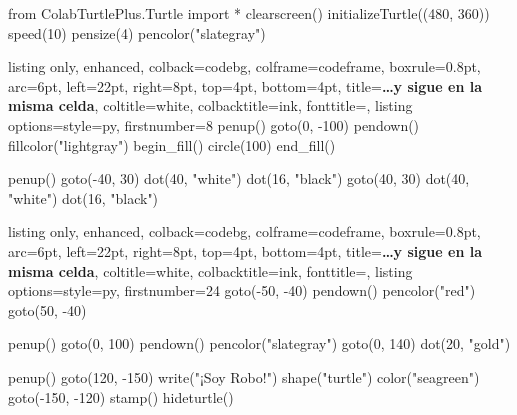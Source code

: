 \begin{typethis}
from ColabTurtlePlus.Turtle import *
clearscreen()
initializeTurtle((480, 360))
speed(10)
pensize(4)
pencolor("slategray")
\end{typethis}
\begin{tcbraster}[raster columns=2, raster column skip=10pt, raster valign=top]
\begin{tcblisting}{listing only, enhanced, colback=codebg, colframe=codeframe, boxrule=0.8pt, arc=6pt, left=22pt, right=8pt, top=4pt, bottom=4pt, title={\textbf{\ldots y sigue en la misma celda}}, coltitle=white, colbacktitle=ink, fonttitle=\small, listing options={style=py, firstnumber=8}}
penup()
goto(0, -100)
pendown()
fillcolor("lightgray")
begin_fill()
circle(100)
end_fill()

penup()
goto(-40, 30)
dot(40, "white")
dot(16, "black")
goto(40, 30)
dot(40, "white")
dot(16, "black")
\end{tcblisting}
\begin{tcblisting}{listing only, enhanced, colback=codebg, colframe=codeframe, boxrule=0.8pt, arc=6pt, left=22pt, right=8pt, top=4pt, bottom=4pt, title={\textbf{\ldots y sigue en la misma celda}}, coltitle=white, colbacktitle=ink, fonttitle=\small, listing options={style=py, firstnumber=24}}
goto(-50, -40)
pendown()
pencolor("red")
goto(50, -40)

penup()
goto(0, 100)
pendown()
pencolor("slategray")
goto(0, 140)
dot(20, "gold")

penup()
goto(120, -150)
write("¡Soy Robo!")
shape("turtle")
color("seagreen")
goto(-150, -120)
stamp()
hideturtle()
\end{tcblisting}
\end{tcbraster}


